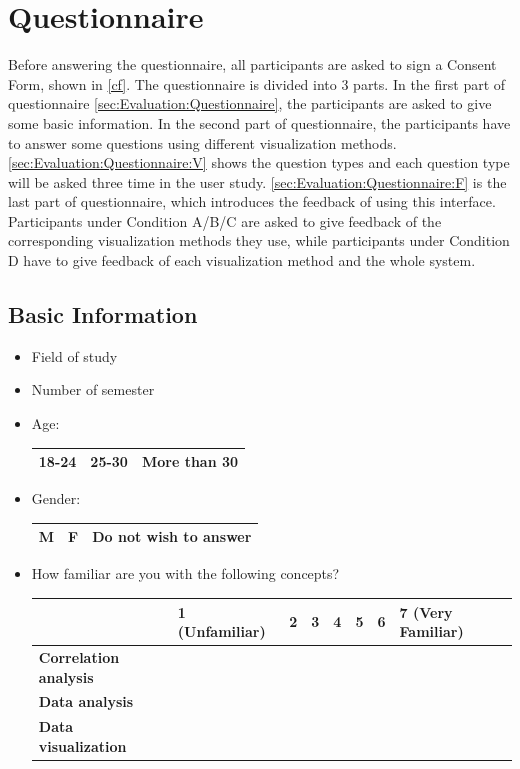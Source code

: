 \section{Questionnaire}
\label{sec:Evaluation:Questionnaire}
Before answering the questionnaire, all participants are asked to sign a Consent Form, shown in \autoref{cf}. The questionnaire is divided into 3 parts. In the first part of questionnaire \autoref{sec:Evaluation:Questionnaire}, the participants are asked to give some basic information. In the second part of questionnaire, the participants have to answer some questions using different visualization methods. \autoref{sec:Evaluation:Questionnaire:V} shows the question types and each question type will be asked three time in the user study. \autoref{sec:Evaluation:Questionnaire:F} is the last part of questionnaire, which introduces the feedback of using this interface. Participants under Condition A/B/C are asked to give feedback of the corresponding visualization methods they use, while participants under Condition D have to give feedback of each visualization method and the whole system.
\subsection{Basic Information}
\label{sec:Evaluation:Questionnaire:BI}
\begin{itemize}
	\item Field of study
	\item Number of semester
	\item Age:\\
	\begin{tabular}{| l | c | r |}
		\hline
		18-24 & 25-30 & More than 30 \\ \hline
	\end{tabular}
	\item Gender:\\
		\begin{tabular}{| l | c | r |}
		\hline
		M & F & Do not wish to answer \\ \hline
	\end{tabular}
	\item How familiar are you with the following concepts?
\begin{center}
	\begin{tabular}{ | l | l | l | l | l | l | l | l |}
		\hline
		                              & 1 (Unfamiliar) & 2 & 3 & 4 & 5 & 6 & 7 (Very Familiar) \\ \hline
		\textbf{Correlation analysis} &                &   &   &   &   &   &                   \\ \hline
		\textbf{Data analysis}        &                &   &   &   &   &   &                   \\ \hline
		\textbf{Data visualization}   &                &   &   &   &   &   &                   \\ \hline
	\end{tabular}
\end{center}
\end{itemize}

